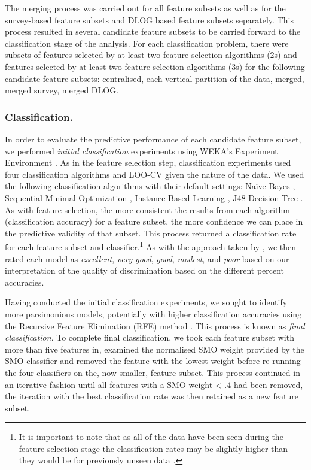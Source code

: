 \documentclass[
  12pt,
  a4paper,
]{book}
\begin{document}
The merging process was carried out for all feature subsets as well as for the survey-based feature subsets and DLOG based feature subsets separately. This process resulted in several candidate feature subsets to be carried forward to the classification stage of the analysis. For each classification problem, there were subsets of features selected by at least two feature selection algorithms (2s) and features selected by at least two feature selection algorithms (3s) for the following candidate feature subsets: centralised, each vertical partition of the data, merged, merged survey, merged DLOG.

\hypertarget{classification.}{%
\subsubsection{Classification.}\label{classification.}}

In order to evaluate the predictive performance of each candidate feature subset, we performed \emph{initial classification} experiments using WEKA's Experiment Environment \citep{Bouckaert2018, Frank2016}. As in the feature selection step, classification experiments used four classification algorithms and LOO-CV given the nature of the data. We used the following classification algorithms with their default settings: Naïve Bayes \citep[NB;][]{John1995}, Sequential Minimal Optimization \citep[SMO;][]{Platt1998}, Instance Based Learning \citep[IBk;][]{Aha1991}, J48 Decision Tree \citep[J48;][]{Quinlan1993}. As with feature selection, the more consistent the results from each algorithm (classification accuracy) for a feature subset, the more confidence we can place in the predictive validity of that subset. This process returned a classification rate for each feature subset and classifier.\footnote{It is important to note that as all of the data have been seen during the feature selection stage the classification rates may be slightly higher than they would be for previously unseen data \citep{Kuncheva2018, Smialowski2010}.} As with the approach taken by \citet{Gullich2019}, we then rated each model as \emph{excellent}, \emph{very good}, \emph{good}, \emph{modest}, and \emph{poor} based on our interpretation of the quality of discrimination based on the different percent accuracies.

Having conducted the initial classification experiments, we sought to identify more parsimonious models, potentially with higher classification accuracies using the Recursive Feature Elimination (RFE) method \citep{Guyon2002}. This process is known as \emph{final classification}. To complete final classification, we took each feature subset with more than five features in, examined the normalised SMO weight provided by the SMO classifier and removed the feature with the lowest weight before re-running the four classifiers on the, now smaller, feature subset. This process continued in an iterative fashion until all features with a SMO weight \textless{} .4 had been removed, the iteration with the best classification rate was then retained as a new feature subset.
\end{document}
